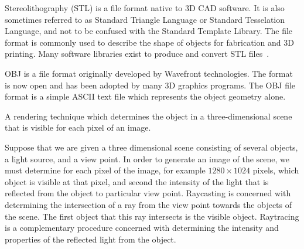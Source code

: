 

{%
Stereolithography (STL) is a file format native to 3D CAD software.
It is also sometimes referred to as Standard Triangle Language or Standard Tesselation Language, and not to be confused with the Standard Template Library.
The file format is commonly used to describe the shape of objects for fabrication and 3D printing.
Many software libraries exist to produce and convert STL files~\cite{botsch2002,cignoni2008,blenderfoundation1995--2017,libigl2017}.
}

{
    OBJ is a file format originally developed by Wavefront technologies.
    The format is now open and has been adopted by many 3D graphics programs.
    The OBJ file format is a simple ASCII text file which represents the object geometry alone.
}

{%
    A rendering technique which determines the object in a three-dimensional scene that is visible for each pixel of an image.

    Suppose that we are given a three dimensional scene consisting of several objects, a light source, and a view point.
    In order to generate an image of the scene, we must determine for each pixel of the image, for example \( 1280 \times 1024\) pixels, which object is visible at that pixel, and second the intensity of the light that is reflected from the object to particular view point.
    Raycasting is concerned with determining the intersection of a ray from the view point towards the objects of the scene.
    The first object that this ray intersects is the visible object.
    Raytracing is a complementary procedure concerned with determining the intensity and properties of the reflected light from the object.
}


